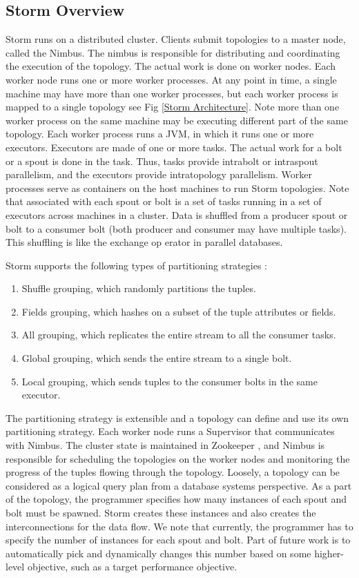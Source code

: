 \documentclass[9pt,twocolumn,twoside]{../../styles/osajnl}
\begin{document}
\subsection{Storm Overview}
Storm runs on a distributed cluster. Clients submit topologies to a
master node, called the Nimbus. The nimbus is responsible for
distributing and coordinating the execution of the topology. The
actual work is done on worker nodes. Each worker node runs one or more
worker processes. At any point in time, a single machine may have more
than one worker processes, but each worker process is mapped to a
single topology see Fig \ref{Storm Architecture}. Note more than one worker process on the same machine
may be executing different part of the same topology. Each worker
process runs a JVM, in which it runs one or more executors. Executors
are made of one or more tasks. The actual work for a bolt or a spout
is done in the task. Thus, tasks provide intrabolt or intraspout
parallelism, and the executors provide intratopology
parallelism. Worker processes serve as containers on the host machines
to run Storm topologies. Note that associated with each spout or bolt
is a set of tasks running in a set of executors across machines in a
cluster. Data is shuffled from a producer spout or bolt to a consumer
bolt (both producer and consumer may have multiple tasks). This
shuffling is like the exchange op erator in parallel databases.

Storm supports the following types of partitioning strategies \cite{storm}:

\begin{enumerate}  
\item Shuffle grouping, which randomly partitions the tuples.
\item Fields grouping, which hashes on a subset of the tuple
  attributes or fields.
\item All grouping, which replicates the entire stream to all the
  consumer tasks.
\item Global grouping, which sends the entire stream to a single bolt.
\item Local grouping, which sends tuples to the consumer bolts in the
  same executor.
  
\end{enumerate}
The partitioning strategy is extensible and a topology can define and
use its own partitioning strategy.  Each worker node runs a Supervisor
that communicates with Nimbus.  The cluster state is maintained in
Zookeeper \cite{www-zookeeper}, and Nimbus is responsible for scheduling
the topologies on the worker nodes and monitoring the progress of the
tuples flowing through the topology. Loosely, a topology can be
considered as a logical query plan from a database systems
perspective. As a part of the topology, the programmer specifies how
many instances of each spout and bolt must be spawned. Storm creates
these instances and also creates the interconnections for the data
flow. We note that currently, the programmer has to specify the number
of instances for each spout and bolt. Part of future work is to
automatically pick and dynamically changes this number based on some
higher-level objective, such as a target performance objective.
\end{document}
